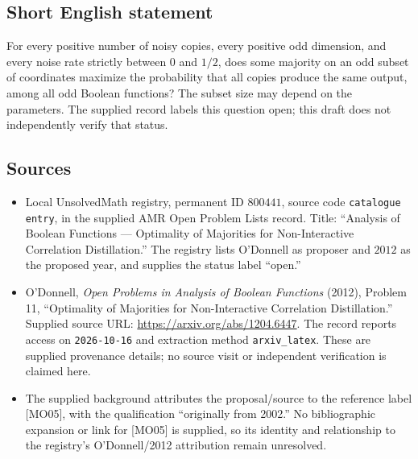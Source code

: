 \documentclass[11pt]{article}
\begin{document}
\subsection{Short English statement}
For every positive number of noisy copies, every positive odd dimension, and every noise rate strictly between \(0\) and \(1/2\), does some majority on an odd subset of coordinates maximize the probability that all copies produce the same output, among all odd Boolean functions? The subset size may depend on the parameters. The supplied record labels this question open; this draft does not independently verify that status.
\subsection{Sources}
\begin{itemize}
\item Local UnsolvedMath registry, permanent ID \(800441\), source code \texttt{catalogue entry}, in the supplied AMR Open Problem Lists record. Title: ``Analysis of Boolean Functions --- Optimality of Majorities for Non-Interactive Correlation Distillation.'' The registry lists O'Donnell as proposer and \(2012\) as the proposed year, and supplies the status label ``open.''
\item O'Donnell, \emph{Open Problems in Analysis of Boolean Functions} (2012), Problem 11, ``Optimality of Majorities for Non-Interactive Correlation Distillation.'' Supplied source URL: \url{https://arxiv.org/abs/1204.6447}. The record reports access on \texttt{2026-10-16} and extraction method \texttt{arxiv\_latex}. These are supplied provenance details; no source visit or independent verification is claimed here.
\item The supplied background attributes the proposal/source to the reference label [MO05], with the qualification ``originally from 2002.'' No bibliographic expansion or link for [MO05] is supplied, so its identity and relationship to the registry's O'Donnell/2012 attribution remain unresolved.
\end{itemize}
\end{document}
